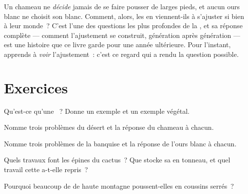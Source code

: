 \begin{remark}\label{rem:g4:adapted-to-their-world:how}
Un chameau ne \emph{décide} jamais de se faire pousser de larges
pieds, et aucun ours blanc ne choisit son  blanc. Comment,
alors, les  en viennent-ils à s'ajuster si bien à leur
monde~? C'est l'une des questions les plus profondes de la ,
et sa réponse complète --- comment l'ajustement se construit,
génération après génération --- est une histoire que ce livre garde
pour une année ultérieure. Pour l'instant, apprends à \emph{voir}
l'ajustement~: c'est ce regard qui a rendu la question possible.
\end{remark}

\section{Exercices}

\begin{exercise}[$\star$]\label{exo:g4:adapted-to-their-world:1}
Qu'est-ce qu'une ~? Donne un exemple  et un exemple
végétal.
\end{exercise}

\begin{exercise}[$\star$]\label{exo:g4:adapted-to-their-world:2}
Nomme trois problèmes du désert et la réponse du chameau à chacun.
\end{exercise}

\begin{exercise}[$\star$]\label{exo:g4:adapted-to-their-world:3}
Nomme trois problèmes de la banquise et la réponse de l'ours blanc à
chacun.
\end{exercise}

\begin{exercise}[$\star$]\label{exo:g4:adapted-to-their-world:4}
Quels travaux font les épines du cactus~? Que stocke sa  en
tonneau, et quel travail cette  a-t-elle repris~?
\end{exercise}

\begin{exercise}[$\star$]\label{exo:g4:adapted-to-their-world:5}
Pourquoi beaucoup de  de haute montagne poussent-elles en
coussins serrés~?
\end{exercise}

